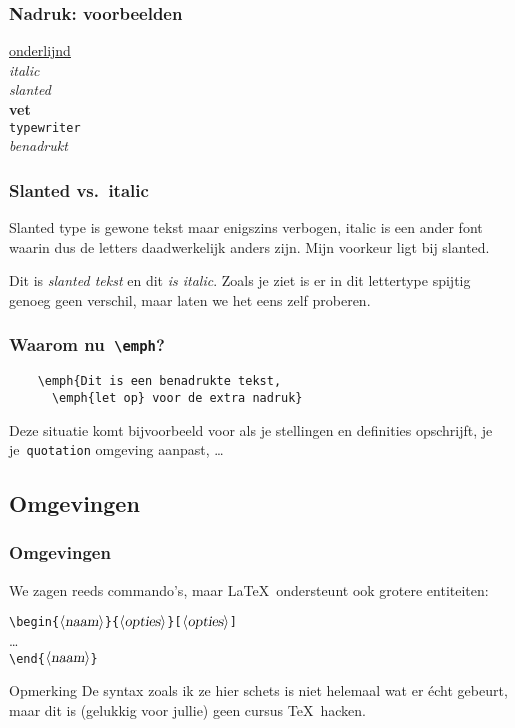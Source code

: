 \begin{frame}[fragile]
  \frametitle{Nadruk: voorbeelden}
  \begin{LTXexample}
\underline{onderlijnd} \\
\textit{italic} \\
\textsl{slanted} \\
\textbf{vet} \\
\texttt{typewriter} \\
\emph{benadrukt}
  \end{LTXexample}
\end{frame}

\begin{frame}
  \frametitle{Slanted vs.\ italic}

  Slanted type is gewone tekst maar enigszins verbogen, italic is een ander font waarin dus de letters daadwerkelijk anders zijn. Mijn voorkeur ligt bij slanted.

  Dit is \textsl{slanted tekst} en dit \textit{is italic}. Zoals je ziet is er in dit lettertype spijtig genoeg geen verschil, maar laten we het eens zelf proberen.
\end{frame}

\begin{frame}[fragile]
  \frametitle{Waarom nu~\texttt{\textbackslash emph}?}

  \begin{verbatim}
	\emph{Dit is een benadrukte tekst,
	  \emph{let op} voor de extra nadruk}
  \end{verbatim}

  Deze situatie komt bijvoorbeeld voor als je stellingen en definities opschrijft, je je~\verb|quotation| omgeving aanpast, \ldots
\end{frame}

\subsection{Omgevingen}
\begin{frame}
  \frametitle{Omgevingen}
  We zagen reeds commando's, maar \LaTeX~ondersteunt ook grotere entiteiten:

  \texttt{\textcolor{uagreen}{\textbackslash begin}\{$\langle\textsl{naam}\rangle$\}\{$\langle\textsl{opties}\rangle$\}[$\langle\textsl{opties}\rangle$]}\\
  \hspace{2em}\ldots \\  
  \texttt{\textcolor{uagreen}{\textbackslash end}\{$\langle\textsl{naam}\rangle$\}}
  \pause\begin{exampleblock}{Opmerking}
	  De syntax zoals ik ze hier schets is niet helemaal wat er \'echt gebeurt, maar dit is (gelukkig voor jullie) geen cursus \TeX~hacken.
  \end{exampleblock}
\end{frame}


